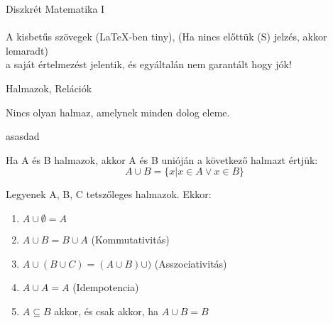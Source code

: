 \documentclass{beamer}
\newcommand{\mmedskip}{\vspace{0.5em}}
\newcommand{\mbigskip}{\vspace{1em}}
\begin{document}
\begin{frame}[plain]
\begin{tcolorbox}[center, colback={myyellow}, coltext={black}, colframe={myyellow}]
{\Huge Diszkrét Matematika I}\\
\mbigskip
\\
A kisbetűs szövegek (LaTeX-ben tiny), (Ha nincs előttük (S) jelzés, akkor lemaradt)\\
a saját értelmezést jelentik, és egyáltalán nem garantált hogy jók!
\end{tcolorbox}
\end{frame}


\begin{frame}[plain]
\begin{tcolorbox}[center, colback={myyellow}, coltext={black}, colframe={myyellow}]
    {\Huge Halmazok, Relációk}
    \mmedskip
\end{tcolorbox}
\end{frame}

\begin{frame}

\begin{tcolorbox}[title={Tétel: Minden dolog halmaza}]
Nincs olyan halmaz, amelynek minden dolog eleme.
\end{tcolorbox}

\begin{tcolorbox}[title={Biz}]
asasdad
\end{tcolorbox}

\end{frame}

\begin{frame}

\begin{tcolorbox}[title={Definíció: Unió}]
Ha A és B halmazok, akkor A és B unióján a következő halmazt értjük:\\
$$A \cup B = \{x | x \in A \vee x \in B\}$$
\end{tcolorbox}

\begin{tcolorbox}[title={Tétel: Az unió tulajdonságai}]
Legyenek A, B, C tetszőleges halmazok. Ekkor:

\begin{enumerate}
\item $A \cup \emptyset = A$
\item $A \cup B = B \cup A$ (Kommutativitás)
\item $A \cup (B \cup C) = (A \cup B) \cup )$ (Asszociativitás)
\item $A \cup A = A$ (Idempotencia)
\item $A \subseteq B$ akkor, és csak akkor, ha $A \cup B = B$
\end{enumerate}

\end{tcolorbox}

\end{frame}
\end{document}
